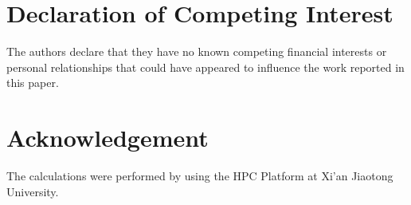 \documentclass[final,5p,times,twocolumn]{elsarticle}
\begin{document}
\section*{Declaration of Competing Interest}
The authors declare that they have no known competing financial interests or personal relationships that could have appeared to influence the work reported in this paper.

\section*{Acknowledgement}
The calculations were performed by using the HPC Platform at Xi’an Jiaotong University.
\end{document}

